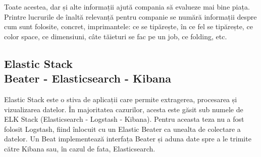 \documentclass[a4paper, 12pt, twoside]{report}
\begin{document}
\bigskip
\bigskip

Toate acestea, dar și alte informații ajută compania să evalueze mai bine piața. Printre lucrurile de înaltă relevanță pentru companie se numără informații despre cum sunt folosite, concret, imprimantele: ce se tipărește, în ce fel se tipărește, ce color space, ce dimensiuni, câte tăieturi se fac pe un job, ce folding, etc. 
		\subsection[Elastic Stack]{Elastic Stack\\ {\normalsize Beater - Elasticsearch - Kibana}}
Elastic Stack este o stiva de aplicații care permite extragerea, procesarea și vizualizarea datelor. În majoritatea cazurilor, acesta este găsit sub numele de ELK Stack (Elasticsearch - Logstash - Kibana). Pentru aceasta teza nu a fost folosit Logstash, fiind înlocuit cu un Elastic Beater ca unealta de colectare a datelor. Un Beat implementează interfața Beater și aduna date spre a le trimite către Kibana sau, în cazul de fata, Elasticsearch.
\end{document}
